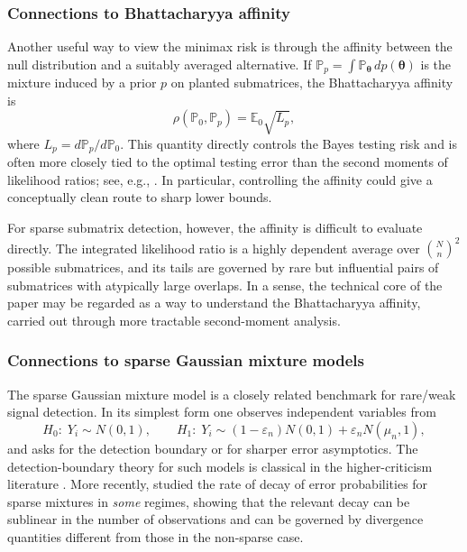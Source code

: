 \documentclass[11pt,reqno,letterpaper]{amsart}
\numberwithin{equation}{section}
\theoremstyle{plain}
\def \btheta{\boldsymbol{\theta}}
\def \E{\mathbb{E}}
\def \P{\mathbb{P}}
\begin{document}
\subsubsection{Connections to Bhattacharyya affinity} Another useful way to view the minimax risk is through the affinity between the null distribution and a suitably averaged alternative. If $\P_p = \int \P_{\btheta}\,d p(\btheta)$ is the mixture induced by a prior $p$ on 
planted submatrices, the Bhattacharyya affinity is
\begin{equation*}
\rho(\P_0, \P_p) = \E_0\sqrt{L_p},
\end{equation*}
where $L_p = d\P_{p}/d\P_0$. This quantity directly controls the Bayes testing risk and is 
often more closely tied to the optimal testing error than the second moments of likelihood 
ratios; see, e.g., \cite{bhattacharyya1946measure,addarioberry2010combinatorial}. In particular, controlling the affinity  could give a conceptually clean route to sharp lower bounds.

For sparse submatrix detection, however, the affinity is difficult to evaluate directly. The integrated likelihood ratio is a highly dependent average over $\binom{N}{n}^2$ possible submatrices, and its tails are governed by rare but influential pairs of submatrices with atypically large overlaps. In a sense, the technical core of the paper may be regarded as a way to understand the Bhattacharyya affinity, carried out through more tractable second-moment analysis.

\subsubsection{Connections to sparse Gaussian mixture models} The sparse Gaussian mixture model is a closely related benchmark for rare/weak signal detection.  In its simplest form one observes independent variables from
\begin{equation*}
    H_0:\;Y_i\sim N(0,1),
    \qquad
    H_1:\;Y_i\sim (1-\varepsilon_n)N(0,1)+\varepsilon_n N(\mu_n,1),
\end{equation*}
and asks for the detection boundary or for sharper error asymptotics.  The detection-boundary theory for such models is classical in the higher-criticism literature \cite{donoho2004higher,cai2011optimal,caiwu2014optimal,ariascastro2019sparse}.  More recently, \cite{ligo2016detecting} studied the rate of decay of error probabilities for sparse mixtures in {\em some} regimes, showing that the relevant decay can be sublinear in the number of observations and can be governed by divergence quantities different from those in the non-sparse case. 
\end{document}
